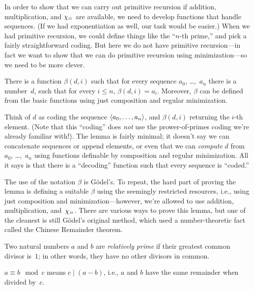 \documentclass[../../../include/open-logic-section]{subfiles}
\begin{document}


In order to show that we can carry out primitive recursion if
addition, multiplication, and $\chi_{=}$ are available, we need to
develop functions that handle sequences. (If we had exponentiation as
well, our task would be easier.) When we had primitive recursion, we
could define things like the ``$n$-th prime,'' and pick a fairly
straightforward coding. But here we do not have primitive
recursion---in fact we want to show that we can do primitive recursion
using minimization---so we need to be more clever.  

\begin{lem}
There is a function $\beta(d,i)$ such that for every sequence $a_0$,
\dots,~$a_n$ there is a number~$d$, such that for every $i \le n$,
$\beta(d,i) = a_i$. Moreover, $\beta$ can be defined from the basic
functions using just composition and regular minimization.
\end{lem}

Think of $d$ as coding the sequence $\langle a_0, \dots, a_n \rangle$, and
$\beta(d,i)$ returning the $i$-th element. (Note that this ``coding''
does \emph{not} use the prower-of-primes coding we're already familiar
with!). The lemma is fairly minimal; it doesn't say we can concatenate
sequences or append elements, or even that we can \emph{compute} $d$
from $a_0$, \dots,~$a_n$ using functions definable by composition and
regular minimization. All it says is that there is a ``decoding''
function such that every sequence is ``coded.''

The use of the notation $\beta$ is G\"odel's. To repeat, the hard part
of proving the lemma is defining a suitable $\beta$ using the
seemingly restricted resources, i.e., using just composition and
minimization---however, we're allowed to use addition, multiplication,
and~$\chi_{=}$. There are various ways to prove this lemma, but one of
the cleanest is still G\"odel's original method, which used a
number-theoretic fact called the Chinese Remainder theorem.

\begin{defn}
Two natural numbers $a$ and $b$ are \emph{relatively prime} if their
greatest common divisor is~$1$; in other words, they have no other
divisors in common.
\end{defn}

\begin{defn}
$a \equiv b \mod c$ means $c \mid (a-b)$, i.e., $a$ and $b$ have the
same remainder when divided by~$c$.
\end{defn}
\end{document}
